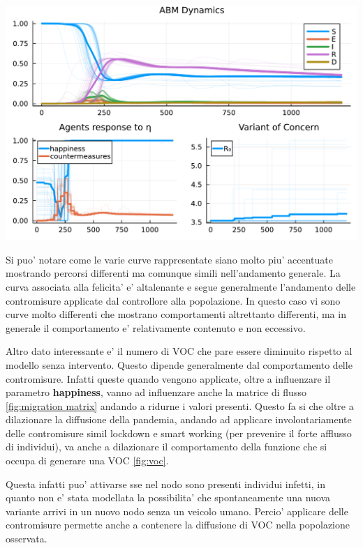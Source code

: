 \begin{minipage}{\linewidth}
	\centering
	\includegraphics[width=\textwidth]{img/SocialNetworkABM_CONTROL.pdf}
	\label{fig:abm_intervent}
\end{minipage}

Si puo' notare come le varie curve rappresentate siano molto piu' accentuate mostrando percorsi differenti 
ma comunque simili nell'andamento generale. La curva associata alla felicita' e' altalenante e segue generalmente
l'andamento delle contromisure applicate dal controllore alla popolazione. In questo caso vi sono curve
molto differenti che mostrano comportamenti altrettanto differenti, ma in generale il comportamento e' 
relativamente contenuto e non eccessivo. 

Altro dato interessante e' il numero di VOC che pare essere diminuito rispetto al modello senza intervento.
Questo dipende generalmente dal comportamento delle contromisure. Infatti queste quando vengono applicate, 
oltre a influenzare il parametro \textbf{happiness}, vanno ad influenzare anche la matrice di flusso \ref{fig:migration matrix}
andando a ridurne i valori presenti. Questo fa si che oltre a dilazionare la diffusione della pandemia, andando 
ad applicare involontariamente delle contromisure simil lockdown e smart working (per prevenire il forte afflusso di individui),
va anche a dilazionare il comportamento della funzione che si occupa di generare una VOC \ref{fig:voc}. 

Questa infatti puo' attivarse sse nel nodo sono presenti individui infetti, in quanto non e' stata modellata la 
possibilita' che spontaneamente una nuova variante arrivi in un nuovo nodo senza un veicolo umano. Percio' 
applicare delle contromisure permette anche a contenere la diffusione di VOC nella popolazione osservata.

